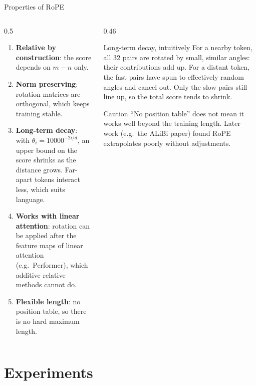 \documentclass[aspectratio=169,11pt]{beamer}
\begin{document}
\begin{frame}{Properties of RoPE}
  \begin{columns}[T]
    \begin{column}{0.5\textwidth}
      \small
      \begin{enumerate}
        \item \textbf{Relative by construction}: the score depends on $m-n$ only.
        \item \textbf{Norm preserving}: rotation matrices are orthogonal, which keeps training stable.
        \item \textbf{Long-term decay}: with $\theta_i=10000^{-2i/d}$, an upper bound on the score shrinks as the distance grows. Far-apart tokens interact less, which suits language.
        \item \textbf{Works with linear attention}: rotation can be applied after the feature maps of linear attention (e.g.\ Performer), which additive relative methods cannot do.
        \item \textbf{Flexible length}: no position table, so there is no hard maximum length.
      \end{enumerate}
    \end{column}
    \begin{column}{0.46\textwidth}
      \begin{exampleblock}{Long-term decay, intuitively}
        \small
        For a nearby token, all 32 pairs are rotated by small, similar angles: their contributions add up.
        For a distant token, the fast pairs have spun to effectively random angles and cancel out.
        Only the slow pairs still line up, so the total score tends to shrink.
      \end{exampleblock}
      \begin{alertblock}{Caution}
        \small
        ``No position table'' does not mean it works well beyond the training length. Later work (e.g.\ the ALiBi paper) found RoPE extrapolates poorly without adjustments.
      \end{alertblock}
    \end{column}
  \end{columns}
\end{frame}

\section{Experiments}
\end{document}
